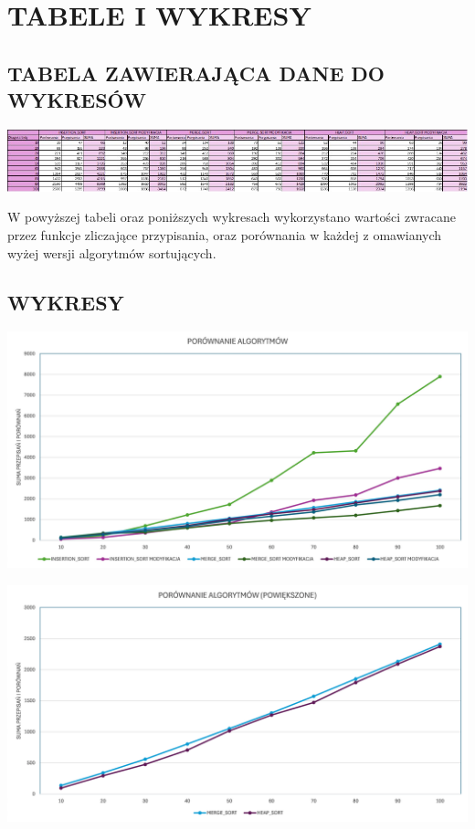 \documentclass{article}
\begin{document}
\section*{TABELE I WYKRESY}
\subsection*{TABELA ZAWIERAJĄCA DANE DO WYKRESÓW}
\begin{center}
\includegraphics[width=\textwidth]{Obraz4.jpg}
\end{center}
W powyższej tabeli oraz poniższych wykresach wykorzystano wartości zwracane przez funkcje zliczające przypisania, oraz porównania w każdej z omawianych wyżej wersji algorytmów sortujących.
\subsection*{WYKRESY}

\begin{center}
	\includegraphics[width=\textwidth]{Obraz3.jpg}
\end{center}
\begin{center}
	\includegraphics[width=\textwidth]{Obraz5.png}
\end{center}
\end{document}
